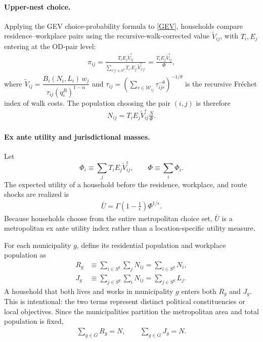 \documentclass[12pt, a4paper]{article}
\theoremstyle{definition}
\theoremstyle{remark}
\begin{document}
\paragraph{Upper-nest choice.}
Applying the GEV choice-probability formula to \eqref{GEV}, households compare residence--workplace pairs using the recursive-walk-corrected value $\tilde V_{ij}$, with $T_i,E_j$ entering at the OD-pair level:
\begin{align}
    \label{eq:pi}
    \pi_{ij} = \frac{T_i E_j \tilde{V}_{ij}^{\epsilon}}{\sum_{i'j' \in S^{2}} T_{i'} E_{j'} \tilde{V}_{i'j'}^{\epsilon}} = \frac{T_iE_j\tilde V_{ij}^\epsilon}{\Phi},
\end{align}
where $\tilde{V}_{ij}=\dfrac{B_i(N_i,L_i)\,w_j}{\tau_{ij}(q_{i}^R)^{1-\alpha}}$ and $\tau_{ij} = \left(\sum_{r\in\mathcal W_{ij}}\tau_{ijr}^{-\theta}\right)^{-1/\theta}$ is the recursive Fréchet index of walk costs. The population choosing the pair $(i,j)$ is therefore
\begin{align}
    \label{eq:pi-pop}
    N_{ij} = T_iE_j\tilde V_{ij}^\epsilon \frac{N}{\Phi}.
\end{align}


\paragraph{Ex ante utility and jurisdictional masses.}
Let
\[
\Phi_i \equiv \sum_j T_iE_j\tilde V_{ij}^{\epsilon},
\qquad
\Phi \equiv \sum_i\Phi_i.
\]
The expected utility of a household before the residence, workplace, and route shocks are realized is
\begin{align}
    \label{eq:Ubar}
    \bar U
    =
    \Gamma\!\left(1-\tfrac{1}{\epsilon}\right)\Phi^{1/\epsilon}.
\end{align}
Because households choose from the entire metropolitan choice set, $\bar U$ is a metropolitan ex ante utility index rather than a location-specific utility measure.

For each municipality $g$, define its residential population and workplace population as
\begin{align}
    \label{eq:municipal-masses}
    R_g
    &\equiv
    \sum_{i\in S^g}\sum_j N_{ij}
    =
    \sum_{i\in S^g}N_i,
    \\
    J_g
    &\equiv
    \sum_{j\in S^g}\sum_i N_{ij}
    =
    \sum_{j\in S^g}L_j.
\end{align}
A household that both lives and works in municipality $g$ enters both $R_g$ and $J_g$. This is intentional: the two terms represent distinct political constituencies or local objectives. Since the municipalities partition the metropolitan area and total population is fixed,
\begin{align}
    \label{eq:mass-adding-up}
    \sum_{g\in G}R_g=N,
    \qquad
    \sum_{g\in G}J_g=N.
\end{align}
\end{document}
